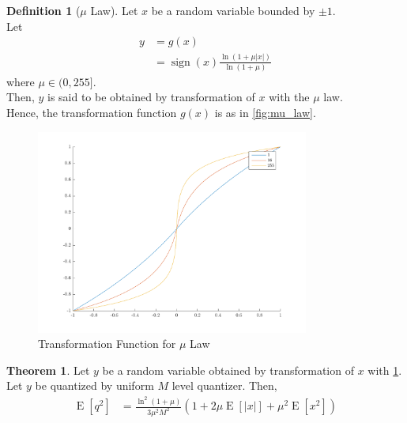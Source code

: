 \documentclass[titlepage, fleqn, a4paper, 12pt, twoside]{article}
\theoremstyle{definition}
\newtheorem{definition}{Definition}
\theoremstyle{theorem}
\newtheorem{theorem}{Theorem}
\DeclareMathOperator{\expct}{\mathrm{E}}
\DeclareMathOperator{\sign}{\mathrm{sign}}
\begin{document}
\begin{definition}[$\mu$ Law]
	Let $x$ be a random variable bounded by $\pm 1$.\\
	Let
	\begin{align*}
		y &= g(x)\\
		&= \sign(x) \frac{\ln\left( 1 + \mu |x| \right)}{\ln(1 + \mu)}
	\end{align*}
	where $\mu \in (0,255]$.\\
	Then, $y$ is said to be obtained by transformation of $x$ with the $\mu$ law.\\
	Hence, the transformation function $g(x)$ is as in \cref{fig:mu_law}.
	\begin{figure}[H]
		\centering
		\includegraphics[width = 0.8\textwidth]{./Plots/mu_law.pdf}
		\caption{Transformation Function for $\mu$ Law}
		\label{fig:transformation_function_for_mu_law}
	\end{figure}
	\label{def:mu_law}
\end{definition}

\begin{theorem}
	Let $y$ be a random variable obtained by transformation of $x$ with \cref{def:mu_law}.\\
	Let $y$ be quantized by uniform $M$ level quantizer.
	Then,
	\begin{align*}
		\expct\left[ q^2 \right] &= \frac{\ln^2(1 + \mu)}{3 \mu^2 M^2} \left( 1 + 2 \mu \expct\left[ |x| \right] + \mu^2 \expct\left[ x^2 \right] \right)
	\end{align*}
\end{theorem}
\end{document}
